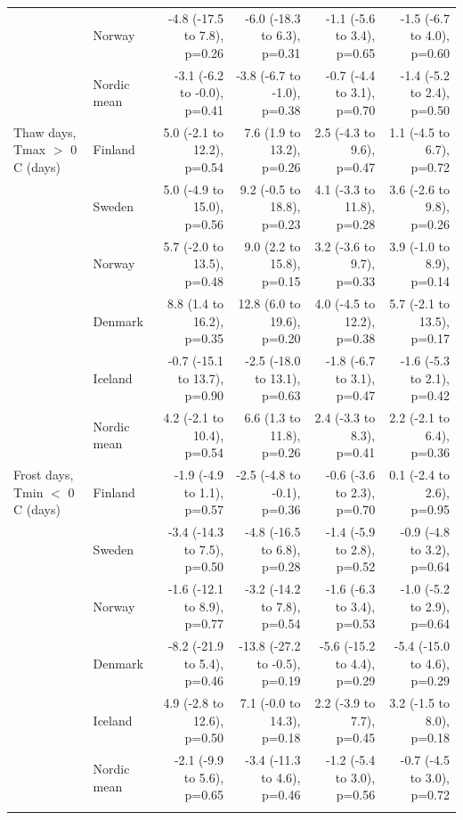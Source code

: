 \begin{tabular}{llrrrr}
 & Norway & -4.8 (-17.5 to 7.8), p=0.26 & -6.0 (-18.3 to 6.3), p=0.31 & -1.1 (-5.6 to 3.4), p=0.65 & -1.5 (-6.7 to 4.0), p=0.60 \\
 & Nordic mean & -3.1 (-6.2 to -0.0), p=0.41 & -3.8 (-6.7 to -1.0), p=0.38 & -0.7 (-4.4 to 3.1), p=0.70 & -1.4 (-5.2 to 2.4), p=0.50 \\
\addlinespace
Thaw days, Tmax $>$ 0 \textdegree{}C (days) & Finland & 5.0 (-2.1 to 12.2), p=0.54 & 7.6 (1.9 to 13.2), p=0.26 & 2.5 (-4.3 to 9.6), p=0.47 & 1.1 (-4.5 to 6.7), p=0.72 \\
 & Sweden & 5.0 (-4.9 to 15.0), p=0.56 & 9.2 (-0.5 to 18.8), p=0.23 & 4.1 (-3.3 to 11.8), p=0.28 & 3.6 (-2.6 to 9.8), p=0.26 \\
 & Norway & 5.7 (-2.0 to 13.5), p=0.48 & 9.0 (2.2 to 15.8), p=0.15 & 3.2 (-3.6 to 9.7), p=0.33 & 3.9 (-1.0 to 8.9), p=0.14 \\
 & Denmark & 8.8 (1.4 to 16.2), p=0.35 & 12.8 (6.0 to 19.6), p=0.20 & 4.0 (-4.5 to 12.2), p=0.38 & 5.7 (-2.1 to 13.5), p=0.17 \\
 & Iceland & -0.7 (-15.1 to 13.7), p=0.90 & -2.5 (-18.0 to 13.1), p=0.63 & -1.8 (-6.7 to 3.1), p=0.47 & -1.6 (-5.3 to 2.1), p=0.42 \\
 & Nordic mean & 4.2 (-2.1 to 10.4), p=0.54 & 6.6 (1.3 to 11.8), p=0.26 & 2.4 (-3.3 to 8.3), p=0.41 & 2.2 (-2.1 to 6.4), p=0.36 \\
\addlinespace
Frost days, Tmin $<$ 0 \textdegree{}C (days) & Finland & -1.9 (-4.9 to 1.1), p=0.57 & -2.5 (-4.8 to -0.1), p=0.36 & -0.6 (-3.6 to 2.3), p=0.70 & 0.1 (-2.4 to 2.6), p=0.95 \\
 & Sweden & -3.4 (-14.3 to 7.5), p=0.50 & -4.8 (-16.5 to 6.8), p=0.28 & -1.4 (-5.9 to 2.8), p=0.52 & -0.9 (-4.8 to 3.2), p=0.64 \\
 & Norway & -1.6 (-12.1 to 8.9), p=0.77 & -3.2 (-14.2 to 7.8), p=0.54 & -1.6 (-6.3 to 3.4), p=0.53 & -1.0 (-5.2 to 2.9), p=0.64 \\
 & Denmark & -8.2 (-21.9 to 5.4), p=0.46 & -13.8 (-27.2 to -0.5), p=0.19 & -5.6 (-15.2 to 4.4), p=0.29 & -5.4 (-15.0 to 4.6), p=0.29 \\
 & Iceland & 4.9 (-2.8 to 12.6), p=0.50 & 7.1 (-0.0 to 14.3), p=0.18 & 2.2 (-3.9 to 7.7), p=0.45 & 3.2 (-1.5 to 8.0), p=0.18 \\
 & Nordic mean & -2.1 (-9.9 to 5.6), p=0.65 & -3.4 (-11.3 to 4.6), p=0.46 & -1.2 (-5.4 to 3.0), p=0.56 & -0.7 (-4.5 to 3.0), p=0.72 \\
\addlinespace
\bottomrule
\end{tabular}